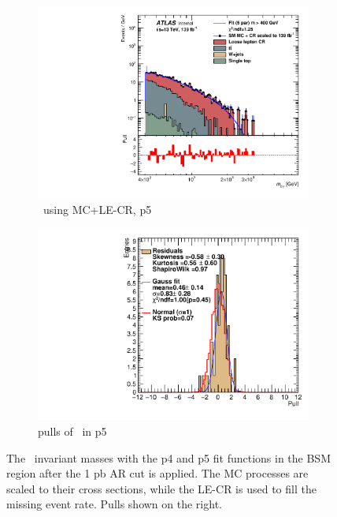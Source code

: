 \begin{figure}[ht]
\begin{subfigure}[h]{0.38\linewidth}
    \includegraphics[scale=0.3]{figs/ch6/fit/variable_nosmooth/p5/1PB/output_SMMCplusCR_Mbg_p5.pdf}%
     \caption{\mjph \ using MC+LE-CR, p5}
     \end{subfigure}
     \hfill
    \begin{subfigure}[h]{0.4\linewidth}
    \includegraphics[scale=0.32]{figs/ch6/fit/variable_nosmooth/p5/1PB/pull_SMMCplusCR_Mbg_p5.pdf}%
    \caption{pulls of \mbph \ in p5}
    \end{subfigure}
    \caption{The \mbph \ invariant masses with the p4 and p5 fit functions in the BSM region after the 1 pb AR cut is applied. The MC processes are scaled to their cross sections, while the LE-CR is used to fill the missing event rate. Pulls shown on the right.}
\label{fig:mbg-fit-pulls-1pb}
\end{figure}

